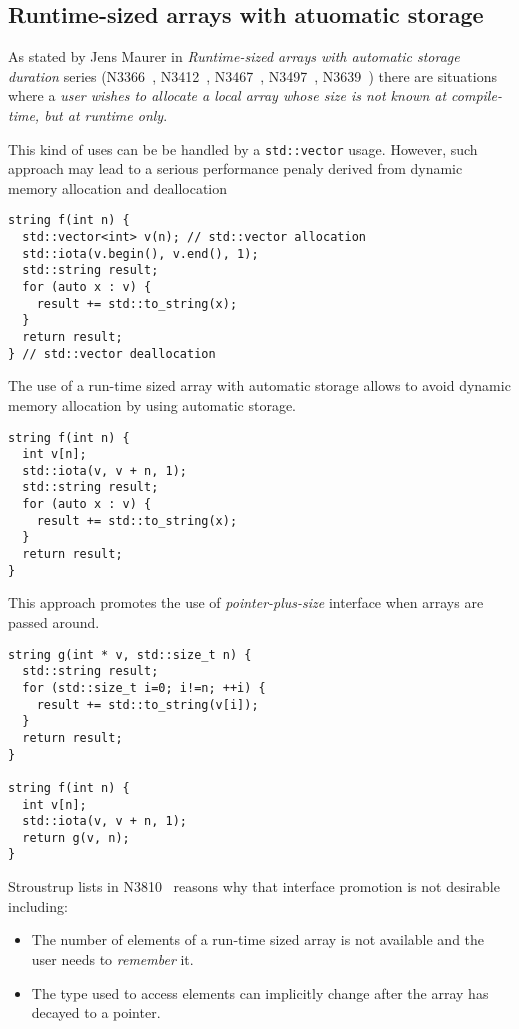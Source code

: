 \subsection{Runtime-sized arrays with atuomatic storage}

As stated by Jens Maurer in \emph{Runtime-sized arrays with automatic storage
duration} series (N3366~\cite{n3366}, N3412~\cite{n3412}, N3467~\cite{n3467},
N3497~\cite{n3497}, N3639~\cite{n3639}) there are situations where a \emph{user wishes to
allocate a local array whose size is not known at compile-time, but at runtime
only}.

This kind of uses can be be handled by a \verb+std::vector+ usage. However, such
approach may lead to a serious performance penaly derived from dynamic memory
allocation and deallocation

\begin{lstlisting}
string f(int n) {
  std::vector<int> v(n); // std::vector allocation
  std::iota(v.begin(), v.end(), 1);
  std::string result;
  for (auto x : v) {
    result += std::to_string(x);
  }
  return result;
} // std::vector deallocation
\end{lstlisting}

The use of a run-time sized array with automatic storage allows to avoid dynamic
memory allocation by using automatic storage.

\begin{lstlisting}
string f(int n) {
  int v[n];
  std::iota(v, v + n, 1);
  std::string result;
  for (auto x : v) {
    result += std::to_string(x);
  }
  return result;
} 
\end{lstlisting}

This approach promotes the use of \emph{pointer-plus-size} interface when arrays
are passed around.

\begin{lstlisting}
string g(int * v, std::size_t n) {
  std::string result;
  for (std::size_t i=0; i!=n; ++i) {
    result += std::to_string(v[i]);
  }
  return result;
}

string f(int n) {
  int v[n];
  std::iota(v, v + n, 1);
  return g(v, n);
} 
\end{lstlisting}

Stroustrup lists in N3810~\cite{n3810} reasons why that interface promotion is not desirable
including:

\begin{itemize}

\item The number of elements of a run-time sized array is not available and the
user needs to \emph{remember} it.

\item The type used to access elements can implicitly change after the array has
decayed to a pointer.

\end{itemize}
